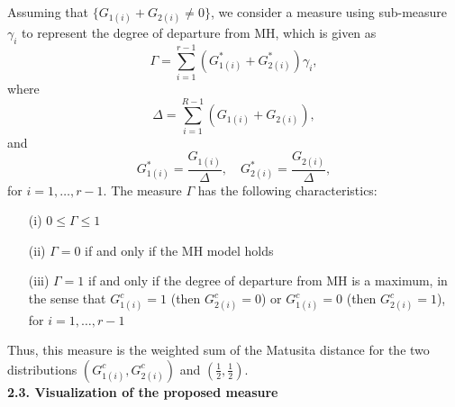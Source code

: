 \documentclass[a4j,12pt]{article}
\begin{document}
Assuming that $\{ G_{1(i)} + G_{2(i)} \neq 0 \}$, we consider a measure using sub-measure $\gamma_i$ to represent the degree of departure from MH, which is given as
\[
\Gamma = \sum^{r-1}_{i=1} \left( G^{\ast}_{1(i)} + G^{\ast}_{2(i)} \right) \gamma_i,
\]
where
\[
\Delta = \sum^{R-1}_{i=1} \left( G_{1(i)} + G_{2(i)} \right),
\]
and
\[
G^{\ast}_{1(i)} = \frac{G_{1(i)}}{\Delta},
\quad
G^{\ast}_{2(i)} = \frac{G_{2(i)}}{\Delta},
\]
for $i=1, \ldots, r-1$.
The measure $\Gamma$ has the following characteristics:
\begin{enumerate}
\item[(i)] $0 \leq \Gamma \leq 1$
\item[(ii)] $\Gamma = 0$ if and only if the MH model holds
\item[(iii)] $\Gamma = 1$ if and only if the degree of departure from MH is a maximum, in the sense that  $G^c_{1(i)}=1$ (then $G^c_{2(i)}=0$) or $G^c_{1(i)}=0$ (then $G^c_{2(i)}=1$), for $i = 1, \ldots, r-1$
\end{enumerate}
Thus, this measure is the weighted sum of the Matusita distance for the two distributions $\left( G^c_{1(i)}, G^c_{2(i)} \right)$ and $\left( \frac{1}{2}, \frac{1}{2} \right)$.
\\


\noindent \textbf{\large 2.3. Visualization of the proposed measure}
\end{document}
